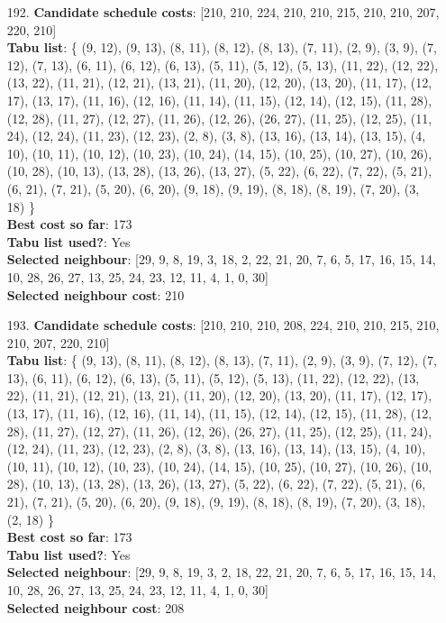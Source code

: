\documentclass[fleqn]{article}
\begin{document}
\begin{itemize}
    \item[192.] \textbf{Candidate schedule costs}: [210, 210, 224, 210, 210, 215, 210, 210, 207, 220, 210] \\
    \textbf{Tabu list}: \{ (9, 12), (9, 13), (8, 11), (8, 12), (8, 13), (7, 11), (2, 9), (3, 9), (7, 12), (7, 13), (6, 11), (6, 12), (6, 13), (5, 11), (5, 12), (5, 13), (11, 22), (12, 22), (13, 22), (11, 21), (12, 21), (13, 21), (11, 20), (12, 20), (13, 20), (11, 17), (12, 17), (13, 17), (11, 16), (12, 16), (11, 14), (11, 15), (12, 14), (12, 15), (11, 28), (12, 28), (11, 27), (12, 27), (11, 26), (12, 26), (26, 27), (11, 25), (12, 25), (11, 24), (12, 24), (11, 23), (12, 23), (2, 8), (3, 8), (13, 16), (13, 14), (13, 15), (4, 10), (10, 11), (10, 12), (10, 23), (10, 24), (14, 15), (10, 25), (10, 27), (10, 26), (10, 28), (10, 13), (13, 28), (13, 26), (13, 27), (5, 22), (6, 22), (7, 22), (5, 21), (6, 21), (7, 21), (5, 20), (6, 20), (9, 18), (9, 19), (8, 18), (8, 19), (7, 20), (3, 18) \} \\
    \textbf{Best cost so far}: 173 \\
    \textbf{Tabu list used?}: Yes \\
    \textbf{Selected neighbour}: [29, 9, 8, 19, 3, 18, 2, 22, 21, 20, 7, 6, 5, 17, 16, 15, 14, 10, 28, 26, 27, 13, 25, 24, 23, 12, 11, 4, 1, 0, 30] \\
    \textbf{Selected neighbour cost}: 210
      

    \item[193.] \textbf{Candidate schedule costs}: [210, 210, 210, 208, 224, 210, 210, 215, 210, 210, 207, 220, 210] \\
    \textbf{Tabu list}: \{ (9, 13), (8, 11), (8, 12), (8, 13), (7, 11), (2, 9), (3, 9), (7, 12), (7, 13), (6, 11), (6, 12), (6, 13), (5, 11), (5, 12), (5, 13), (11, 22), (12, 22), (13, 22), (11, 21), (12, 21), (13, 21), (11, 20), (12, 20), (13, 20), (11, 17), (12, 17), (13, 17), (11, 16), (12, 16), (11, 14), (11, 15), (12, 14), (12, 15), (11, 28), (12, 28), (11, 27), (12, 27), (11, 26), (12, 26), (26, 27), (11, 25), (12, 25), (11, 24), (12, 24), (11, 23), (12, 23), (2, 8), (3, 8), (13, 16), (13, 14), (13, 15), (4, 10), (10, 11), (10, 12), (10, 23), (10, 24), (14, 15), (10, 25), (10, 27), (10, 26), (10, 28), (10, 13), (13, 28), (13, 26), (13, 27), (5, 22), (6, 22), (7, 22), (5, 21), (6, 21), (7, 21), (5, 20), (6, 20), (9, 18), (9, 19), (8, 18), (8, 19), (7, 20), (3, 18), (2, 18) \} \\
    \textbf{Best cost so far}: 173 \\
    \textbf{Tabu list used?}: Yes \\
    \textbf{Selected neighbour}: [29, 9, 8, 19, 3, 2, 18, 22, 21, 20, 7, 6, 5, 17, 16, 15, 14, 10, 28, 26, 27, 13, 25, 24, 23, 12, 11, 4, 1, 0, 30] \\
    \textbf{Selected neighbour cost}: 208
      


\end{itemize}
\end{document}

